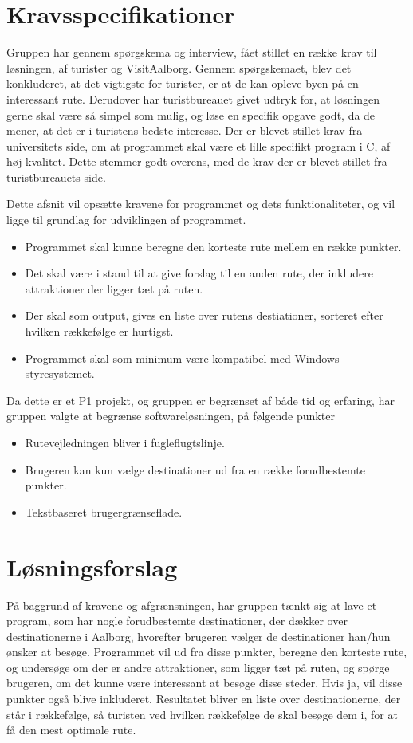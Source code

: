 \section{Kravsspecifikationer}
Gruppen har gennem spørgskema og interview, fået stillet en række krav til løsningen, af turister og VisitAalborg. 
Gennem spørgskemaet, blev det konkluderet, at det vigtigste for turister, er at de kan opleve byen på en interessant rute. 
Derudover har turistbureauet givet udtryk for, at løsningen gerne skal være så simpel som mulig, og løse en specifik opgave godt, da de mener, at det er i turistens bedste interesse. \newline
Der er blevet stillet krav fra universitets side, om at programmet skal være et lille specifikt program i C, af høj kvalitet. Dette stemmer godt overens, med de krav der er blevet stillet fra turistbureauets side.   \newline

Dette afsnit vil opsætte kravene for programmet og dets funktionaliteter, og vil ligge til grundlag for udviklingen af programmet. 

\begin{itemize}
	\item Programmet skal kunne beregne den korteste rute mellem en række punkter.
	\item Det skal være i stand til at give forslag til en anden rute, der inkludere attraktioner der ligger tæt på ruten.
 	\item Der skal som output, gives en liste over rutens destiationer, sorteret efter hvilken rækkefølge er hurtigst.
 	\item Programmet skal som minimum være kompatibel med Windows styresystemet. 
\end{itemize}

Da dette er et P1 projekt, og gruppen er begrænset af både tid og erfaring, har gruppen valgte at begrænse softwareløsningen, på følgende punkter \newline
\begin{itemize}
	\item Rutevejledningen bliver i fugleflugtslinje.
	\item Brugeren kan kun vælge destinationer ud fra en række forudbestemte punkter.
	\item Tekstbaseret brugergrænseflade.
\end{itemize}

\section{Løsningsforslag}
På baggrund af kravene og afgrænsningen, har gruppen tænkt sig at lave et program, som har nogle forudbestemte destinationer, der dækker over destinationerne i Aalborg, hvorefter brugeren vælger de destinationer han/hun ønsker at besøge. Programmet vil ud fra disse punkter, beregne den korteste rute, og undersøge om der er andre attraktioner, som ligger tæt på ruten, og spørge brugeren, om det kunne være interessant at besøge disse steder. Hvis ja, vil disse punkter også blive inkluderet. Resultatet bliver en liste over destinationerne, der står i rækkefølge, så turisten ved hvilken rækkefølge de skal besøge dem i, for at få den mest optimale rute.
